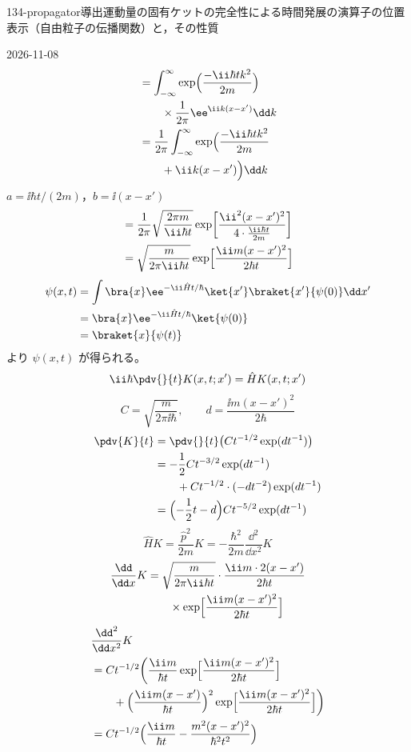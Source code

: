 \documentclass[uplatex,dvipdfmx,a4paper,11pt]{jsarticle}
\begin{document}
\begin{mondai}{134-propagator}{導出}{運動量の固有ケットの完全性による時間発展の演算子の位置表示（自由粒子の伝播関数）と，その性質}
\begin{kotaeutsushi}{2026-11-08}
\begin{align*}
&=\int_{-\infty}^{\infty}\exp\Bigl(\frac{-\ii\hbar tk^{2}}{2m}\Bigr)\\
&\qquad\times\frac{1}{2\pi}\ee^{\ii k(x-x')}\dd k\\
&=\frac{1}{2\pi}\int_{-\infty}^{\infty}\exp\Bigl(\frac{-\ii\hbar tk^{2}}{2m}\\
&\qquad+\ii k(x-x')\Bigr)\dd k
\end{align*}
$a=\ii\hbar t/(2m)$，$b=\ii(x-x')$
\begin{align*}
&=\frac{1}{2\pi}\sqrt{\frac{2\pi m}{\ii\hbar t}}\exp\biggl[\frac{\ii^{2}(x-x')^{2}}{4\cdot\frac{\ii\hbar t}{2m}}\biggr]\\
&=\sqrt{\frac{m}{2\pi\ii\hbar t}}\exp\Bigl[\frac{\ii m(x-x')^{2}}{2\hbar t}\Bigr]
\end{align*}
\begin{align*}
\psi(x,t)&=\int\bra{x}\ee^{-\ii\hat{H}t/\hbar}\ket{x'}\braket{x'}{\psi(0)}\dd x'\\
&=\bra{x}\ee^{-\ii\hat{H}t/\hbar}\ket{\psi(0)}\\
&=\braket{x}{\psi(t)}
\end{align*}
より $\psi(x,t)$ が得られる。
\[ \ii\hbar\pdv{}{t}K(x,t;x')=\hat{H}K(x,t;x') \]
\[ C=\sqrt{\frac{m}{2\pi\ii\hbar}},\qquad d=\frac{\ii m(x-x')^{2}}{2\hbar} \]
\begin{align*}
\pdv{K}{t}&=\pdv{}{t}\bigl(Ct^{-1/2}\exp(dt^{-1})\bigr)\\
&=-\frac{1}{2}Ct^{-3/2}\exp(dt^{-1})\\
&\qquad+Ct^{-1/2}\cdot(-dt^{-2})\exp(dt^{-1})\\
&=\Bigl(-\frac{1}{2}t-d\Bigr)Ct^{-5/2}\exp(dt^{-1})
\end{align*}
\[ \hat{H}K=\frac{\hat{p}^{2}}{2m}K=-\frac{\hbar^{2}}{2m}\frac{\dd^{2}}{\dd x^{2}}K \]
\begin{align*}
\frac{\dd}{\dd x}K&=\sqrt{\frac{m}{2\pi\ii\hbar t}}\cdot\frac{\ii m\cdot2(x-x')}{2\hbar t}\\
&\qquad\times\exp\Bigl[\frac{\ii m(x-x')^{2}}{2\hbar t}\Bigr]
\end{align*}
\begin{align*}
&\frac{\dd^{2}}{\dd x^{2}}K\\
&=Ct^{-1/2}\biggl(\frac{\ii m}{\hbar t}\exp\Bigl[\frac{\ii m(x-x')^{2}}{2\hbar t}\Bigr]\\
&\qquad+\Bigl(\frac{\ii m(x-x')}{\hbar t}\Bigr)^{2}\exp\Bigl[\frac{\ii m(x-x')^{2}}{2\hbar t}\Bigr]\biggr)\\
&=Ct^{-1/2}\Bigl(\frac{\ii m}{\hbar t}-\frac{m^{2}(x-x')^{2}}{\hbar^{2}t^{2}}\Bigr)\\

\end{align*}
\end{kotaeutsushi}
\end{mondai}
\end{document}
